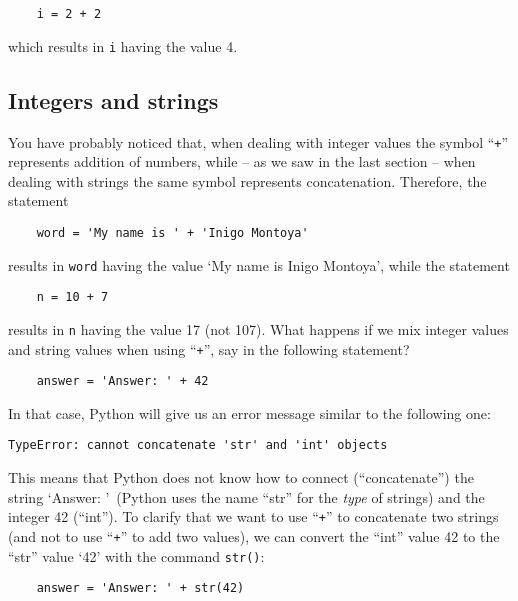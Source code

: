 \begin{Verbatim}
    i = 2 + 2
\end{Verbatim}

which results in \verb.i. having the value 4. 

\subsection*{Integers and strings}
\label{sec:intstr}

You have probably noticed that, when dealing with integer
values the symbol ``\texttt{+}'' represents addition of numbers, while -- as
we saw in the last section -- when dealing with strings the same
symbol represents concatenation. Therefore, the statement

\begin{Verbatim}
    word = 'My name is ' + 'Inigo Montoya'
\end{Verbatim}

results in \verb+word+ having the value `My name is Inigo Montoya',
while the statement

\begin{Verbatim}
    n = 10 + 7
\end{Verbatim}

results in \verb+n+ having the value 17 (not 107). What happens if we
mix integer values and string values when using ``\texttt{+}'', say in the
following statement?

\begin{Verbatim}
    answer = 'Answer: ' + 42
\end{Verbatim}

In that case, Python will give us an error message similar to the
following one:

\begin{Verbatim}
TypeError: cannot concatenate 'str' and 'int' objects
\end{Verbatim}

This means that Python does not know how to connect (``concatenate'')
the string `Answer: '\ (Python uses the name ``str'' for the
\emph{type} of strings) and the integer 42 (``int'').
To clarify that we want to use ``\texttt{+}'' to concatenate two strings (and
not to use ``\texttt{+}'' to add two values), we can convert the ``int'' value
42 to the ``str'' value `42' with the command \verb!str()!:

\begin{verbatim}
    answer = 'Answer: ' + str(42)
\end{verbatim}

